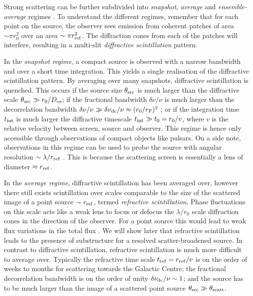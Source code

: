 Strong scattering can be further subdivided into \emph{snapshot}, \emph{average} and \emph{ensemble-average} regimes \citep*{Narayan_1989,Goodman_1989}. To understand the different regimes, remember that for each point on the source, the observer sees emission from coherent patches of area $\sim \pi r_0^2$ over an area $\sim \pi r_{\rm ref}^2$. The diffraction cones from each of the patches will interfere, resulting in a multi-slit \emph{diffractive scintillation} pattern. 

In the \emph{snapshot regime}, a compact source is observed with a narrow bandwidth and over a short time integration. This yields a single realisation of the diffractive scintillation pattern. By averaging over many snapshots, diffractive scintillation is quenched. This occurs if the source size $\theta_{\rm src}$ is much larger than the diffractive scale $\theta_{\rm src} \gg r_0/D_{\rm os}$; if the fractional bandwidth $\delta \nu/\nu$ is much larger than the decorrelation bandwidth $\delta \nu/\nu \gg \delta \nu_{\rm dc}/\nu \approx (r_0/r_{\rm F})^2$ \citep{Narayan_1992}; or if the integration time $t_{\rm int}$ is much larger the diffractive timescale $t_{\rm int} \gg t_{\rm 0} = r_0/v$, where $v$ is the relative velocity between screen, source and observer. This regime is hence only accessible through observations of compact objects like pulsars. On a side note, observations in this regime can be used to probe the source with angular resolution $\sim \lambda /r_{\rm ref}$ \citep[e.g.][]{Gwinn_2012}. This is because the scattering screen is essentially a lens of diameter $\approx r_{\rm ref}$.

In the \emph{average regime}, diffractive scintillation has been averaged over, however there still exists scintillation over scales comparable to the size of the scattered image of a point source $\sim r_{\rm ref}$, termed \emph{refractive scintillation}. Phase fluctuations on this scale acts like a weak lens to focus or defocus the $\lambda/ r_0$ scale diffraction cones in the direction of the observer. For a point source this would lead to weak flux variations in the total flux \citep{Narayan_1992}. We will show later that refractive scintillation leads to the presence of substructure for a resolved scatter-broadened source. In contrast to diffractive scintillation, refractive scintillation is much more difficult to average over. Typically the refractive time scale $t_{\rm ref} = r_{\rm ref}/v$ is on the order of weeks to months for scattering towards the Galactic Centre; the fractional decorrelation bandwidth is on the order of unity $\delta \nu_{\rm dc}/\nu \sim 1$; and the source has to be much larger than the image of a scattered point source $\theta_{\rm src} \gg \theta_{\rm scatt}$. 

